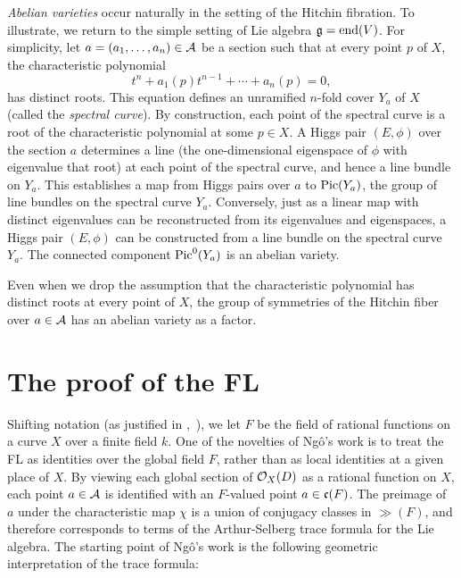 {\it Abelian varieties} occur naturally in the setting of the Hitchin
fibration.  To illustrate, we return to the simple setting of Lie
algebra $\gg=\op{end}(V)$.  For simplicity, let $a=(a_1,\ldots,a_n)\in
\AA$ be a section such that at every point $p$ of $X$, the characteristic
polynomial 
\begin{equation}\label{eqn:spectral}
t^n + a_1(p) t^{n-1} + \cdots+ a_n(p)=0,
\end{equation} 
has distinct roots.  This equation defines an unramified $n$-fold
cover $Y_a$ of $X$ (called the {\it spectral curve}).  By
construction, each point of the spectral curve is a root of the
characteristic polynomial at some $p\in X$.  A Higgs pair $(E,\phi)$
over the section $a$ determines a line (the one-dimensional eigenspace
of $\phi$ with eigenvalue that root) at each point of the spectral curve,
and hence a line bundle on $Y_a$.  This establishes a map from
Higgs pairs over $a$ to $\op{Pic}(Y_a)$, the group of line
bundles on the spectral curve $Y_a$.  Conversely, just as a
linear map with distinct eigenvalues can be reconstructed from its
eigenvalues and eigenspaces, a Higgs pair $(E,\phi)$ can be
constructed from a line bundle on the spectral curve $Y_a$.
The connected component $\op{Pic}^0(Y_a)$ is an abelian
variety.

Even when we drop the assumption that the characteristic polynomial
has distinct roots at every point of $X$, the group of symmetries of
the Hitchin fiber over $a\in\AA$ has an abelian
variety as a factor.


\section{The proof of the FL}

Shifting notation (as justified in \cite{Wald:2006},~\cite{CHL:2010}),
we let $F$ be the field of rational functions on a curve $X$ over a
finite field $k$.  One of the novelties of Ng\^o's work is to treat
the FL as identities over the global field $F$, rather than as local
identities at a given place of $X$.
By viewing each global section of $\OO_X(D)$ as a
rational function on $X$, each point $a\in{\AA}$ is identified with an
$F$-valued point $a\in \cc(F)$.  The preimage of $a$ under the
characteristic map $\chi$ is a union of conjugacy classes in $\gg(F)$,
and therefore corresponds to terms of the Arthur-Selberg trace formula
for the Lie algebra.  The starting point of Ng\^o's work is the
following geometric interpretation of the trace formula:

